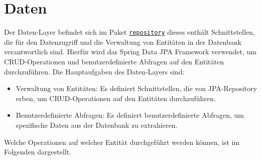 
\chapter{Daten}
\label{ch:data}
Der Daten-Layer befindet sich im Paket \hyperref[edu.kit.hci.soli.repository]{\texttt{repository}} dieses enthält Schnittstellen, die für den Datenzugriff und die Verwaltung von Entitäten in der Datenbank verantwortlich sind.
Hierfür wird das Spring Data JPA Framework verwendet, um \gls{CRUD}-Operationen und benutzerdefinierte Abfragen auf den Entitäten durchzuführen.
Die Hauptaufgaben des Daten-Layers sind:

\begin{itemize}
    \item Verwaltung von Entitäten: Es definiert Schnittstellen, die von JPA-Repository erben, um CRUD-Operationen auf den Entitäten durchzuführen.
    \item Benutzerdefinierte Abfragen: Es definiert benutzerdefinierte Abfragen, um spezifische Daten aus der Datenbank zu extrahieren.
\end{itemize}

Welche Operationen auf welcher Entität durchgeführt werden können, ist im Folgenden dargestellt.

